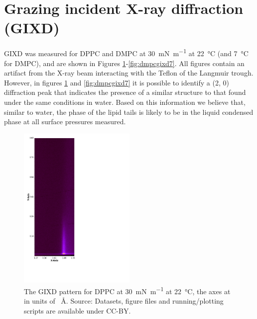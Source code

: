 \documentclass[11pt,a4paper]{paper}
\begin{document}
\section{Grazing incident X-ray diffraction (GIXD)}
\label{sec:gixd}
GIXD was measured for DPPC and DMPC at \SI{30}{\milli\newton\per\meter} at \SI{22}{\celsius} (and \SI{7}{\celsius} for DMPC), and are shown in Figures \ref{fig:dppcgixd}-\ref{fig:dmpcgixd7}. All figures contain an artifact from the X-ray beam interacting with the Teflon of the Langmuir trough. However, in figures \ref{fig:dppcgixd} and \ref{fig:dmpcgixd7} it is possible to identify a (2, 0) diffraction peak that indicates the presence of a similar structure to that found under the same conditions in water.\cite{Watkins2009} Based on this information we believe that, similar to water, the phase of the lipid tails is likely to be in the liquid condensed phase at all surface pressures measured.
\begin{figure}[h]
	\centering
	\includegraphics[width=0.50\textwidth]{figures/206041}
	\caption{The GIXD pattern for DPPC at \SI{30}{\milli\newton\per\meter} at \SI{22}{\celsius}, the axes at in units of \si{\per\angstrom}. Source: Datasets, figure files and running/plotting scripts are available under CC-BY.\cite{mccluskey_2018}}
	\label{fig:dppcgixd}
\end{figure}
\end{document}
